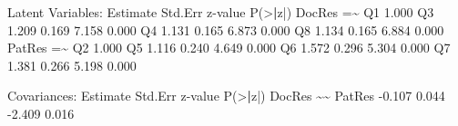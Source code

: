 \documentclass[
]{article}
\newenvironment{Shaded}{\begin{snugshade}}{\end{snugshade}}
\newcommand{\ErrorTok}[1]{\textcolor[rgb]{0.64,0.00,0.00}{\textbf{#1}}}
\newcommand{\FloatTok}[1]{\textcolor[rgb]{0.00,0.00,0.81}{#1}}
\newcommand{\FunctionTok}[1]{\textcolor[rgb]{0.00,0.00,0.00}{#1}}
\newcommand{\NormalTok}[1]{#1}
\newcommand{\OtherTok}[1]{\textcolor[rgb]{0.56,0.35,0.01}{#1}}
\newcommand{\SpecialCharTok}[1]{\textcolor[rgb]{0.00,0.00,0.00}{#1}}
\begin{document}
\begin{Shaded}
\begin{Highlighting}[]
\NormalTok{Latent Variables}\SpecialCharTok{:}
\NormalTok{                   Estimate  Std.Err  z}\SpecialCharTok{{-}}\NormalTok{value  }\FunctionTok{P}\NormalTok{(}\SpecialCharTok{\textgreater{}}\ErrorTok{|}\NormalTok{z}\SpecialCharTok{|}\NormalTok{)}
\NormalTok{  DocRes }\OtherTok{=}\ErrorTok{\textasciitilde{}}                                           
\NormalTok{    Q1                }\FloatTok{1.000}                           
\NormalTok{    Q3                }\FloatTok{1.209}    \FloatTok{0.169}    \FloatTok{7.158}    \FloatTok{0.000}
\NormalTok{    Q4                }\FloatTok{1.131}    \FloatTok{0.165}    \FloatTok{6.873}    \FloatTok{0.000}
\NormalTok{    Q8                }\FloatTok{1.134}    \FloatTok{0.165}    \FloatTok{6.884}    \FloatTok{0.000}
\NormalTok{  PatRes }\OtherTok{=}\ErrorTok{\textasciitilde{}}                                           
\NormalTok{    Q2                }\FloatTok{1.000}                           
\NormalTok{    Q5                }\FloatTok{1.116}    \FloatTok{0.240}    \FloatTok{4.649}    \FloatTok{0.000}
\NormalTok{    Q6                }\FloatTok{1.572}    \FloatTok{0.296}    \FloatTok{5.304}    \FloatTok{0.000}
\NormalTok{    Q7                }\FloatTok{1.381}    \FloatTok{0.266}    \FloatTok{5.198}    \FloatTok{0.000}

\NormalTok{Covariances}\SpecialCharTok{:}
\NormalTok{                   Estimate  Std.Err  z}\SpecialCharTok{{-}}\NormalTok{value  }\FunctionTok{P}\NormalTok{(}\SpecialCharTok{\textgreater{}}\ErrorTok{|}\NormalTok{z}\SpecialCharTok{|}\NormalTok{)}
\NormalTok{  DocRes }\SpecialCharTok{\textasciitilde{}}\ErrorTok{\textasciitilde{}}                                           
\NormalTok{    PatRes           }\SpecialCharTok{{-}}\FloatTok{0.107}    \FloatTok{0.044}   \SpecialCharTok{{-}}\FloatTok{2.409}    \FloatTok{0.016}


\end{Highlighting}
\end{Shaded}
\end{document}

